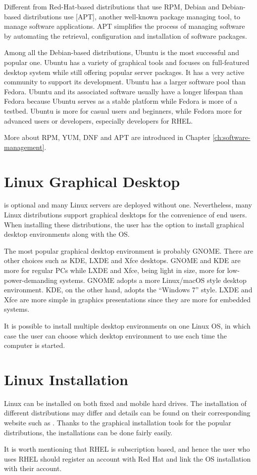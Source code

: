 Different from Red-Hat-based distributions that use RPM, Debian and Debian-based distributions use [APT], another well-known package managing tool, to manage software applications. APT simplifies the process of managing software by automating the retrieval, configuration and installation of software packages. 

Among all the Debian-based distributions, Ubuntu is the most successful and popular one. Ubuntu has a variety of graphical tools and focuses on full-featured desktop system while still offering popular server packages. It has a very active community to support its development. Ubuntu has a larger software pool than Fedora. Ubuntu and its associated software usually have a longer lifespan than Fedora because Ubuntu serves as a stable platform while Fedora is more of a testbed. Ubuntu is more for casual users and beginners, while Fedora more for advanced users or developers, especially developers for RHEL.

More about RPM, YUM, DNF and APT are introduced in Chapter \ref{ch:software-management}.

\section{Linux Graphical Desktop}

 is optional and many Linux servers are deployed without one. Nevertheless, many Linux distributions support graphical desktops for the convenience of end users. When installing these distributions, the user has the option to install graphical desktop environments along with the OS. 

The most popular graphical desktop environment is probably GNOME. There are other choices such as KDE, LXDE and Xfce desktops. GNOME and KDE are more for regular PCs while LXDE and Xfce, being light in size, more for low-power-demanding systems. GNOME adopts a more Linux/macOS style desktop environment. KDE, on the other hand, adopts the ``Windows 7'' style. LXDE and Xfce are more simple in graphics presentations since they are more for embedded systems.

It is possible to install multiple desktop environments on one Linux OS, in which case the user can choose which desktop environment to use each time the computer is started.

\section{Linux Installation}

Linux can be installed on both fixed and mobile hard drives. The installation of different distributions may differ and details can be found on their corresponding website such as \cite{ubuntu2025ubuntu,fedora2025fedora,rhel2025rhel,centos2026}. Thanks to the graphical installation tools for the popular distributions, the installations can be done fairly easily.

It is worth mentioning that RHEL is subscription based, and hence the user who uses RHEL should register an account with Red Hat and link the OS installation with their account.
